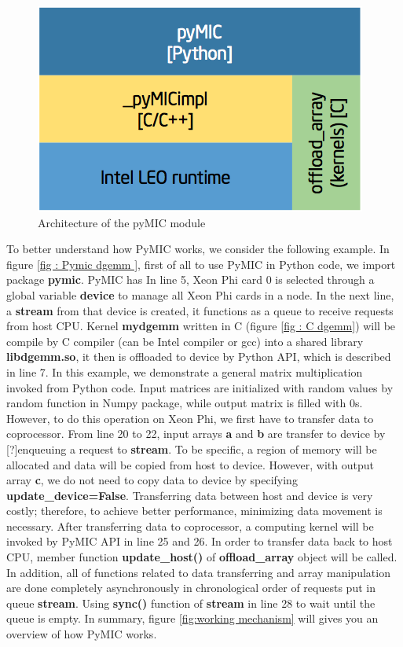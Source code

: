 \begin{figure}[h]
\centering
\includegraphics[scale=0.5]{img/pymic-arch.png}
\caption{Architecture of the pyMIC module}
\label{fig:pymic-arch}
\end{figure}

To better understand how PyMIC works, we consider the following example. In figure \ref{fig : Pymic dgemm }, first of all to use PyMIC in Python code, we import package \textbf{pymic}. PyMIC has  In line 5, Xeon Phi card 0 is selected through a global variable \textbf{device} to manage all Xeon Phi cards in a node. In the next line, a \textbf{stream} from that device is created, it functions as a queue to receive requests from host CPU. Kernel \textbf{mydgemm} written in C (figure \ref{fig : C dgemm}) will be compile by C compiler (can be Intel compiler or gcc) into a shared library \textbf{libdgemm.so}, it then is offloaded to device by Python API, which is described in line 7. In this example, we demonstrate a general matrix multiplication invoked from Python code. Input matrices are initialized  with random values by random function in Numpy package, while output matrix is filled with 0s. However, to do this operation on Xeon Phi, we first have to transfer data to coprocessor. From line 20 to 22, input arrays \textbf{a} and \textbf{b} are transfer to device by [?]enqueuing a request to \textbf{stream}. To be specific, a region of memory will be allocated and data will be copied from host to device. However, with output array \textbf{c}, we do not need to copy data to device by specifying \textbf{update\_device=False}. Transferring data between host and device is very costly; therefore, to achieve better performance, minimizing data movement is necessary. After transferring data to coprocessor, a computing kernel will be invoked by PyMIC API in line 25 and 26. In order to transfer data back to host CPU, member function \textbf{update\_host()} of \textbf{offload\_array} object will be called. In addition, all of functions related to data transferring and array manipulation are done completely asynchronously in chronological order of requests put in queue \textbf{stream}. Using \textbf{sync()} function  of \textbf{stream} in line 28 to wait until the queue is empty. In summary, figure \ref{fig:working mechanism} will gives you an overview of how PyMIC works.

